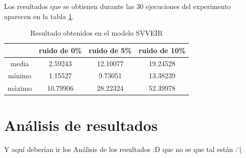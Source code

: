 Los resultados que se obtienen durante las 30 ejecuciones del experimento aparecen en la tabla \ref{table:experiment_SVVEIR}.

\begin{table}[!h]
    \centering
    \caption{Resultado obtenidos en el modelo SVVEIR}
    \begin{tabular}{|c|c|c|c|}
        \hline
               & \textbf{ruido de 0\%} & \textbf{ruido de 5\%} & \textbf{ruido de 10\%} \\
        \hline
        media  & 2.59243               & 12.10077              & 19.24528               \\
        \hline
        mínimo & 1.15527               & 9.73051               & 13.38239               \\
        \hline
        máximo & 10.79906              & 28.22324              & 52.39978               \\
        \hline
    \end{tabular}
    \label{table:experiment_SVVEIR}
\end{table}

\section{Análisis de resultados}

Y aquí deberían ir los Análisis de los resultados :D que no se que tal están :'(